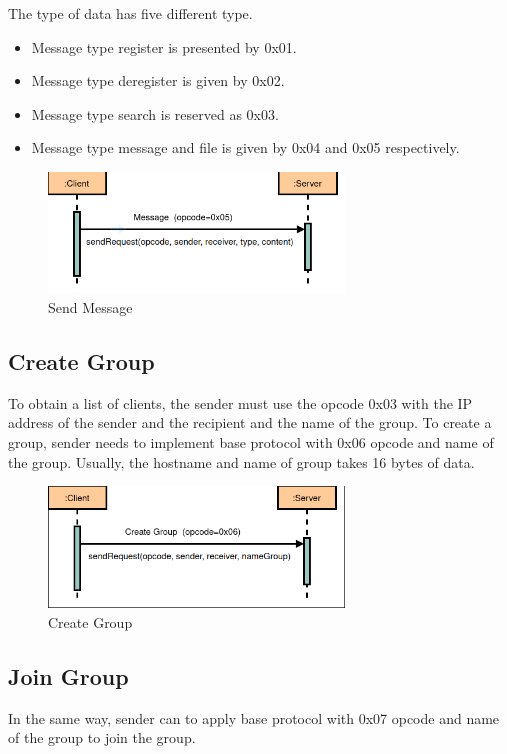 \noindent
The type of data has five different type.
\begin{itemize}
    \item Message type register is presented by 0x01.
    \item Message type deregister is given by 0x02.
    \item Message type search is reserved as 0x03.
    \item Message type message and file is given by 0x04 and 0x05 respectively.
\end{itemize}

\begin{figure}[htb!]
    \centering
    \includegraphics[width=0.7\textwidth]{gfx/protocoll_message}
    \caption{Send Message}
    \label{fig:send--message}
\end{figure}

\subsection{Create Group}\label{subsec:create}
To obtain a list of clients, the sender must use the opcode 0x03 with the IP address of the sender
and the recipient and the name of the group.
To create a group, sender needs to implement base protocol with 0x06 opcode and name of the group.
Usually, the hostname and name of group takes 16 bytes of data.

\begin{figure}[htb!]
    \centering
    \includegraphics[width=0.7\textwidth]{gfx/protocoll_create_group}
    \caption{Create Group}
    \label{fig:group-create}
\end{figure}

\subsection{Join Group}\label{subsec:join}
In the same way, sender can to apply base protocol with 0x07 opcode and name of the group to join
the group.

